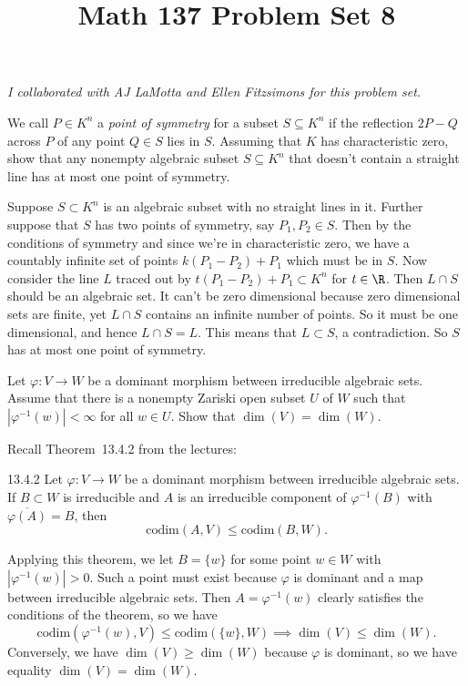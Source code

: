\documentclass[11pt,letterpaper]{article}
\title{\textbf{Math 137 Problem Set 8}}
\begin{document}
\maketitle

\begin{center}
    \textit{I collaborated with AJ LaMotta and Ellen Fitzsimons for this problem set.}
\end{center}

\begin{problem}
    We call $P\in K^n$ a \emph{point of symmetry} for a subset $S\subseteq K^n$ if the reflection $2P-Q$ across $P$ of any point $Q\in S$ lies in $S$. Assuming that $K$ has characteristic zero, show that any nonempty algebraic subset $S\subseteq K^n$ that doesn't contain a straight line has at most one point of symmetry.
\end{problem}

\begin{solution}
    Suppose $S\subset K^n$ is an algebraic subset with no straight lines in it. Further suppose that $S$ has two points of symmetry, say $P_1, P_2\in S$. Then by the conditions of symmetry and since we're in characteristic zero, we have a countably infinite set of points $k(P_1-P_2)+P_1$ which must be in $S$. Now consider the line $L$ traced out by $t(P_1-P_2)+P_1\subset K^n$ for $t\in \R$. Then $L\cap S$ should be an algebraic set. It can't be zero dimensional because zero dimensional sets are finite, yet $L\cap S$ contains an infinite number of points. So it must be one dimensional, and hence $L\cap S = L$. This means that $L\subset S$, a contradiction. So $S$ has at most one point of symmetry.
\end{solution}

\begin{problem}
    Let $\varphi:V\rightarrow W$ be a dominant morphism between irreducible algebraic sets. Assume that there is a nonempty Zariski open subset $U$ of $W$ such that $|\varphi^{-1}(w)|<\infty$ for all $w\in U$. Show that $\dim(V) = \dim(W)$.
\end{problem}

\begin{solution}
    Recall Theorem~13.4.2 from the lectures:
    \begin{ctheorem}{13.4.2} Let $\varphi : V \to W$ be a dominant morphism between irreducible algebraic sets. If $B\subset W$ is irreducible and $A$ is an irreducible component of $\varphi^{-1}(B)$ with $\overline{\varphi(A)}=B$, then 
    \[
        \textrm{codim}(A, V) \leq \textrm{codim}(B, W)
    .\] 
    \end{ctheorem}
    Applying this theorem, we let $B=\{w\}$ for some point $w\in W$ with $|\varphi^{-1}(w)|>0$. Such a point must exist because $\varphi$ is dominant and a map between irreducible algebraic sets. Then $A=\varphi^{-1}(w)$ clearly satisfies the conditions of the theorem, so we have
    \[
        \textrm{codim}(\varphi^{-1}(w), V)\leq \textrm{codim}(\{w\}, W) \implies \dim(V) \leq \dim(W)
    .\] 
    Conversely, we have $\dim(V) \geq \dim(W)$ because $\varphi$ is dominant, so we have equality $\dim(V)=\dim(W)$.
\end{solution}
\end{document}
